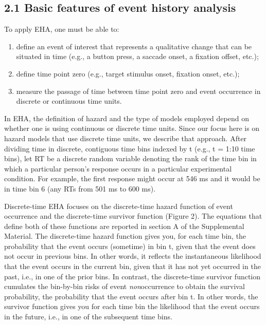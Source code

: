 \documentclass[
  man, donotrepeattitle,floatsintext]{apa6}
\begin{document}
\subsection{2.1 Basic features of event history analysis}\label{basic-features-of-event-history-analysis}

To apply EHA, one must be able to:

\begin{enumerate}
\def\labelenumi{\arabic{enumi}.}
\item
  define an event of interest that represents a qualitative change that can be situated in time (e.g., a button press, a saccade onset, a fixation offset, etc.);
\item
  define time point zero (e.g., target stimulus onset, fixation onset, etc.);
\item
  measure the passage of time between time point zero and event occurrence in discrete or continuous time units.
\end{enumerate}

In EHA, the definition of hazard and the type of models employed depend on whether one is using continuous or discrete time units. Since our focus here is on hazard models that use discrete time units, we describe that approach. After dividing time in discrete, contiguous time bins indexed by t (e.g., t = 1:10 time bins), let RT be a discrete random variable denoting the rank of the time bin in which a particular person's response occurs in a particular experimental condition. For example, the first response might occur at 546 ms and it would be in time bin 6 (any RTs from 501 ms to 600 ms).

Discrete-time EHA focuses on the discrete-time hazard function of event occurrence and the discrete-time survivor function (Figure 2). The equations that define both of these functions are reported in section A of the Supplemental Material. The discrete-time hazard function gives you, for each time bin, the probability that the event occurs (sometime) in bin t, given that the event does not occur in previous bins. In other words, it reflects the instantaneous likelihood that the event occurs in the current bin, given that it has not yet occurred in the past, i.e., in one of the prior bins. In contrast, the discrete-time survivor function cumulates the bin-by-bin risks of event \emph{non}occurrence to obtain the survival probability, the probability that the event occurs after bin t. In other words, the survivor function gives you for each time bin the likelihood that the event occurs in the future, i.e., in one of the subsequent time bins.
\end{document}
